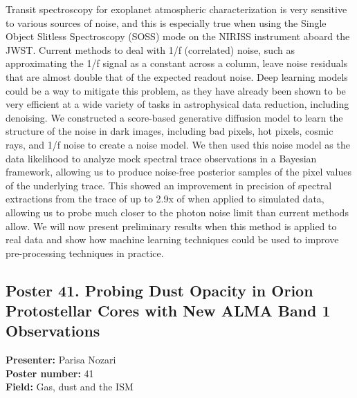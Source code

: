Transit spectroscopy for exoplanet atmospheric characterization is very sensitive to various sources of noise, and this is especially true when using the Single Object Slitless Spectroscopy (SOSS) mode on the NIRISS instrument aboard the JWST. Current methods to deal with 1/f (correlated) noise, such as approximating the 1/f signal as a constant across a column, leave noise residuals that are almost double that of the expected readout noise. Deep learning models could be a way to mitigate this problem, as they have already been shown to be very efficient at a wide variety of tasks in astrophysical data reduction, including denoising. We constructed a score-based generative diffusion model to learn the structure of the noise in dark images, including bad pixels, hot pixels, cosmic rays, and 1/f noise to create a noise model. We then used this noise model as the data likelihood to analyze mock spectral trace observations in a Bayesian framework, allowing us to produce noise-free posterior samples of the pixel values of the underlying trace. This showed an improvement in precision of spectral extractions from the trace of up to 2.9x of when applied to simulated data, allowing us to probe much closer to the photon noise limit than current methods allow. We will now present preliminary results when this method is applied to real data and show how machine learning techniques could be used to improve pre-processing techniques in practice.

\hypertarget{poster-abstract-talk-158}{}\label{poster-abstract-page-talk-158}
\subsection*{Poster 41. Probing Dust Opacity in Orion Protostellar Cores with New ALMA Band 1 Observations}
\textbf{Presenter:} Parisa Nozari\\
\textbf{Poster number:} 41\\
\textbf{Field:} Gas, dust and the ISM

